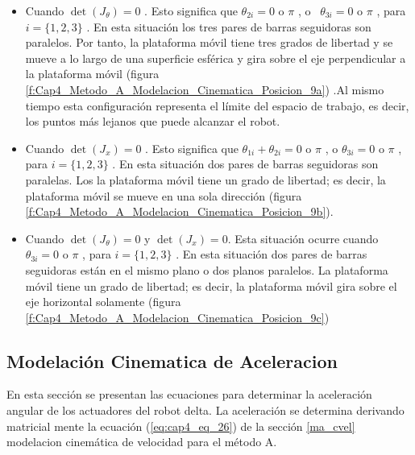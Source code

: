        \begin{itemize}
	        \item {\fontsize{10pt}{12.0pt}\selectfont Cuando  $\det  \left( J_{ \theta } \right) =0$ . Esto significa que  $\theta _{2i}=0$  o  $\pi$ , o \   $\theta _{3i}=0$ o  $\pi$  , para  \( i = \{ 1,2 ,3 \}  \) . En esta situación los tres pares de barras seguidoras son paralelos. Por tanto, la plataforma móvil tiene tres grados de libertad y se mueve a lo largo de una superficie esférica y gira sobre el eje perpendicular a la plataforma móvil (figura \ref{f:Cap4_Metodo_A_Modelacion_Cinematica_Posicion_9a}) .Al mismo tiempo esta configuración representa el límite del espacio de trabajo, es decir, los puntos más lejanos que puede alcanzar el robot. }

	        \item {\fontsize{10pt}{12.0pt}\selectfont Cuando  $\det  \left( J_{x} \right) =0 $ . Esto significa que    $ \theta _{1i}+  \theta _{2i}=0$  o  $\pi$ , o $\theta _{3i}=0$  o  $ \pi $   , para  \( i = \{ 1,2 ,3 \}  \) . En esta situación dos pares de barras seguidoras son paralelas. Los la plataforma móvil tiene un grado de libertad; es decir, la plataforma móvil se mueve en una sola dirección (figura \ref{f:Cap4_Metodo_A_Modelacion_Cinematica_Posicion_9b}).}

	        \item {\fontsize{10pt}{12.0pt}\selectfont Cuando $ \det  \left( J_{ \theta } \right) =0 $  y $ \det  \left( J_{x} \right) =0 $. Esta situación ocurre cuando  $  \theta _{3i}=0$ o  $ \pi  $  , para  \( i = \{ 1,2 ,3 \}  \) . En esta situación dos pares de barras seguidoras están en el mismo plano o dos planos paralelos. La plataforma móvil tiene un grado de libertad; es decir, la plataforma móvil gira sobre el eje horizontal solamente (figura \ref{f:Cap4_Metodo_A_Modelacion_Cinematica_Posicion_9c})}
\end{itemize}

    
    \newpage
    
    \subsection{Modelación Cinematica de Aceleracion}\label{ma_acel}

    En esta sección se presentan las ecuaciones para determinar la aceleración angular de los actuadores del robot delta. La aceleración se determina derivando matricial mente la ecuación (\ref{eq:cap4_eq_26}) de la sección \ref{ma_cvel} modelacion cinemática de velocidad para el método A.

